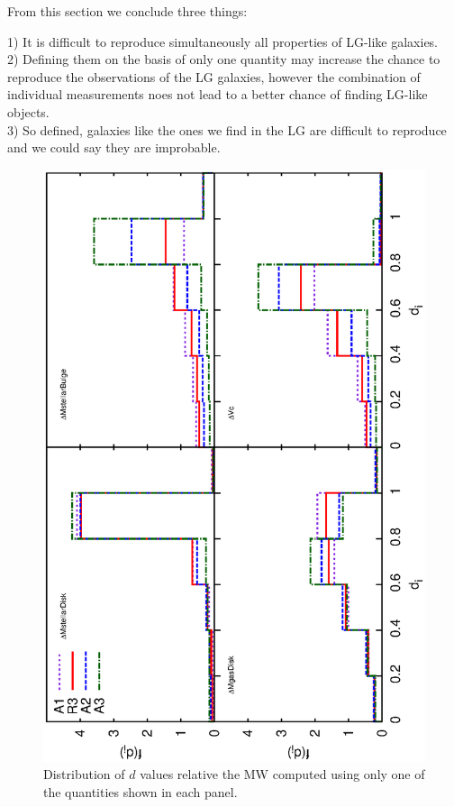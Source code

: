 \documentclass[useAMS,usenatbib]{mn2e}
\begin{document}
From this section we conclude three things:

1) It is difficult to reproduce simultaneously all properties of
LG-like galaxies.\\

2) Defining them on the basis of only one quantity may increase the
chance to reproduce the observations of the LG galaxies, however the
combination of individual measurements noes not lead to a better
chance of finding LG-like objects.\\

3) So defined, galaxies like the ones we find in the LG are difficult
to reproduce and we could say they are improbable.\\



\begin{figure}
  \includegraphics[scale=0.35,angle=270]{figures/multiplot_MW.ps}
  \caption{Distribution of $d$ values relative the MW computed using
    only one of the quantities shown in each panel.}
  \label{fig:multiplot_MW}
\end{figure}
\end{document}
